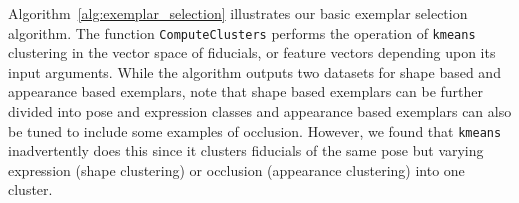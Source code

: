 Algorithm~\ref{alg:exemplar_selection} illustrates our basic exemplar selection algorithm.
The function \texttt{ComputeClusters} performs the operation of \texttt{kmeans} clustering in the
vector space of fiducials, or feature vectors depending upon its input arguments.
While the algorithm outputs two datasets for shape based and appearance based exemplars, note
that shape based exemplars can be further divided into pose and expression classes and
appearance based exemplars can also be tuned to include some examples of occlusion.
However, we found that \texttt{kmeans} inadvertently does this since it clusters fiducials
of the same pose but varying expression (shape clustering) or occlusion (appearance
clustering) into one cluster.
